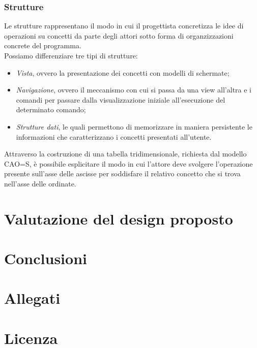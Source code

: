 \documentclass[12pt,a4paper]{report}
\begin{document}
\subsection{Strutture}
Le strutture rappresentano il modo in cui il progettista concretizza le idee di operazioni su concetti da parte degli attori sotto forma di organzizzazioni concrete del programma.\\
Possiamo differenziare tre tipi di strutture:
\begin{itemize}
\item \textit{Vista}, ovvero la presentazione dei concetti con modelli di schermate;
\item \textit{Navigazione}, ovvero il meccanismo con cui si passa da una view all'altra e i comandi per passare dalla visualizzazione iniziale all'esecuzione del determinato comando;
\item \textit{Strutture dati}, le quali permettono di memorizzare in maniera persistente le informazioni che caratterizzano i concetti presentati all'utente.
\end{itemize}
Attraverso la costruzione di una tabella tridimensionale, richiesta dal modello CAO=S, è possibile esplicitare il modo in cui l'attore deve svolgere l'operazione presente sull'asse delle ascisse per soddisfare il relativo concetto che si trova nell'asse delle ordinate.
\chapter{Valutazione del design proposto}
\chapter{Conclusioni}
\chapter{Allegati}
\chapter{Licenza}
\end{document}
